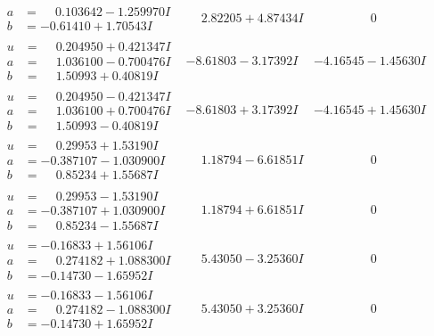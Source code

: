 \documentclass[1p]{elsarticle_modified}
\theoremstyle{definition}
\begin{document}
$$\begin{array}{c|c|c}
\begin{aligned}
a &= \phantom{-}0.103642 - 1.259970 I \\
b &= -0.61410 + 1.70543 I\end{aligned}
 & \phantom{-}2.82205 + 4.87434 I & \phantom{-0.000000 } 0 \\ \hline\begin{aligned}
u &= \phantom{-}0.204950 + 0.421347 I \\
a &= \phantom{-}1.036100 - 0.700476 I \\
b &= \phantom{-}1.50993 + 0.40819 I\end{aligned}
 & -8.61803 - 3.17392 I & -4.16545 - 1.45630 I \\ \hline\begin{aligned}
u &= \phantom{-}0.204950 - 0.421347 I \\
a &= \phantom{-}1.036100 + 0.700476 I \\
b &= \phantom{-}1.50993 - 0.40819 I\end{aligned}
 & -8.61803 + 3.17392 I & -4.16545 + 1.45630 I \\ \hline\begin{aligned}
u &= \phantom{-}0.29953 + 1.53190 I \\
a &= -0.387107 - 1.030900 I \\
b &= \phantom{-}0.85234 + 1.55687 I\end{aligned}
 & \phantom{-}1.18794 - 6.61851 I & \phantom{-0.000000 } 0 \\ \hline\begin{aligned}
u &= \phantom{-}0.29953 - 1.53190 I \\
a &= -0.387107 + 1.030900 I \\
b &= \phantom{-}0.85234 - 1.55687 I\end{aligned}
 & \phantom{-}1.18794 + 6.61851 I & \phantom{-0.000000 } 0 \\ \hline\begin{aligned}
u &= -0.16833 + 1.56106 I \\
a &= \phantom{-}0.274182 + 1.088300 I \\
b &= -0.14730 - 1.65952 I\end{aligned}
 & \phantom{-}5.43050 - 3.25360 I & \phantom{-0.000000 } 0 \\ \hline\begin{aligned}
u &= -0.16833 - 1.56106 I \\
a &= \phantom{-}0.274182 - 1.088300 I \\
b &= -0.14730 + 1.65952 I\end{aligned}
 & \phantom{-}5.43050 + 3.25360 I & \phantom{-0.000000 } 0\\

\end{array}$$
\end{document}
